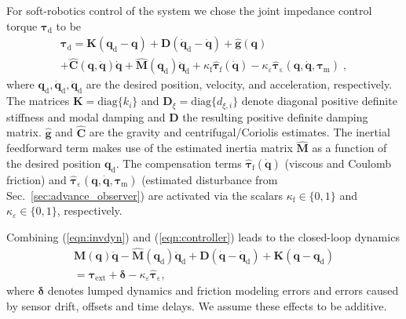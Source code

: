 For soft-robotics control of the system we chose the joint impedance control torque $\bm{\tau}_\mathrm{d}$ to be
\begin{equation}
\begin{gathered}
\bm{\tau}_\mathrm{d}=
\bm{K}(\bm{q}_\mathrm{d}-\bm{q})+\bm{D}(\dot{\bm{q}}_\mathrm{d}-\dot{\bm{q}})+\hat{\bm{g}}(\bm{q}) %
\\
+\hat{\bm{C}}(\bm{q},\dot{\bm{q}})\dot{\bm{q}} %
+\hat{\bm{M}}(\bm{q}_\mathrm{d})\ddot{\bm{q}}_\mathrm{d} %
+\kappa_{\mathrm{f}} \hat{\bm{\tau}}_\mathrm{f}(\dot{\bm{q}})
-\kappa_{\varepsilon} \hat{\bm{\tau}}_\mathrm{\varepsilon}(\bm{q}, \dot{\bm{q}},\bm{\tau}_\mathrm{m})\;,
\label{eqn:controller}
\end{gathered}
\end{equation}
where $\bm{q}_\mathrm{d}, \dot{\bm{q}}_\mathrm{d}, \ddot{\bm{q}}_\mathrm{d}$ are the desired position, velocity, and acceleration, respectively. The matrices $\bm{K}=\mathrm{diag}\{k_i\}$ and $\bm{D}_\xi=\mathrm{diag}\{d_{\xi,i}\}$ denote diagonal positive definite stiffness and modal damping and $\bm{D}$ the resulting positive definite damping matrix.
$\hat{\bm{g}}$ and $\hat{\bm{C}}$ are the gravity and centrifugal/Coriolis estimates.
The inertial feedforward term makes use of the estimated inertia matrix $\hat{\bm{M}}$ as a function of the desired position $\bm{q}_\mathrm{d}$.
The compensation terms $\hat{\bm{\tau}}_\mathrm{f}(\dot{\bm{q}})$ (viscous and Coulomb friction) and $\hat{\bm{\tau}}_\mathrm{\varepsilon}(\bm{q}, \dot{\bm{q}},\bm{\tau}_\mathrm{m})$ (estimated disturbance from Sec.~\ref{sec:advance_observer}) are activated via the scalars $\kappa_{\mathrm{f}}\in \{0,1\}$ and $\kappa_{\varepsilon}\in \{0,1\}$, respectively.

Combining (\ref{eqn:invdyn}) and (\ref{eqn:controller}) leads to the closed-loop dynamics
\begin{equation}
\begin{gathered}
\bm{M(\bm{q})}\ddot{\bm{q}}-\hat{\bm{M}}(\bm{q}_\mathrm{d})\ddot{\bm{q}}_\mathrm{d}
+\bm{D}(\dot{\bm{q}}-\dot{\bm{q}}_\mathrm{d})
+\bm{K}(\bm{q}-\bm{q}_\mathrm{d})
 \\
=\bm{\tau}_\mathrm{ext}
+ \bm{\delta}
-\kappa_{\varepsilon} \hat{\bm{\tau}}_\mathrm{\varepsilon},
\label{eqn:closedloop_general}
\end{gathered}
\end{equation}
where $\bm{\delta}$ denotes lumped dynamics and friction modeling errors and errors caused by sensor drift, offsets and time delays. 
We assume these effects to be additive. 

